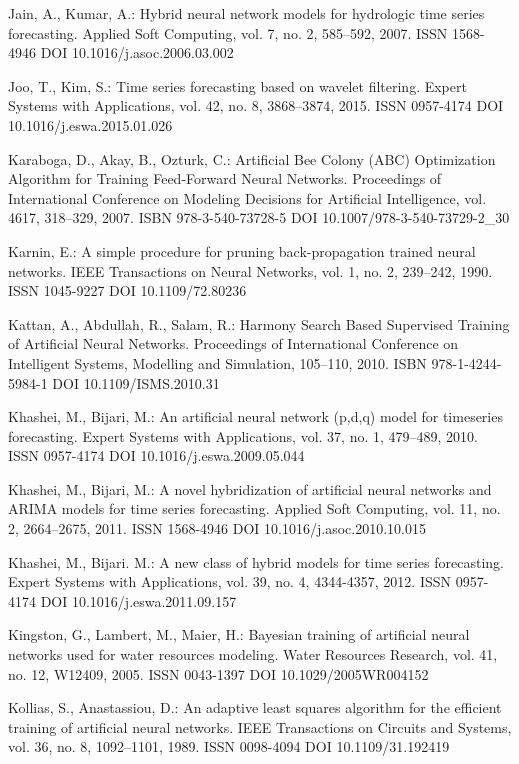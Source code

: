 \begin{thebibliography}{99.}
 Jain, A., Kumar, A.: Hybrid neural network models for hydrologic time series forecasting. Applied Soft Computing, vol. 7, no. 2, 585--592, 2007. ISSN 1568-4946 DOI 10.1016/j.asoc.2006.03.002

 Joo, T., Kim, S.: Time series forecasting based on wavelet filtering. Expert Systems with Applications, vol. 42, no. 8, 3868--3874, 2015. ISSN 0957-4174 DOI 10.1016/j.eswa.2015.01.026

 Karaboga, D., Akay, B., Ozturk, C.: Artificial Bee Colony (ABC) Optimization Algorithm for Training Feed-Forward Neural Networks. Proceedings of International Conference on Modeling Decisions for Artificial Intelligence, vol. 4617, 318--329, 2007. ISBN 978-3-540-73728-5 DOI 10.1007/978-3-540-73729-2\_30

 Karnin, E.: A simple procedure for pruning back-propagation trained neural networks. IEEE Transactions on Neural Networks, vol. 1, no. 2, 239--242, 1990. ISSN 1045-9227 DOI 10.1109/72.80236

 Kattan, A., Abdullah, R., Salam, R.: Harmony Search Based Supervised Training of Artificial Neural Networks. Proceedings of International Conference on Intelligent Systems, Modelling and Simulation, 105--110, 2010. ISBN 978-1-4244-5984-1 DOI 10.1109/ISMS.2010.31

 Khashei, M., Bijari, M.: An artificial neural network (p,d,q) model for timeseries forecasting. Expert Systems with Applications, vol. 37, no. 1, 479--489, 2010. ISSN 0957-4174 DOI 10.1016/j.eswa.2009.05.044

 Khashei, M., Bijari, M.: A novel hybridization of artificial neural networks and ARIMA models for time series forecasting. Applied Soft Computing, vol. 11, no. 2, 2664--2675, 2011. ISSN 1568-4946 DOI 10.1016/j.asoc.2010.10.015

 Khashei, M., Bijari. M.: A new class of hybrid models for time series forecasting. Expert Systems with Applications, vol. 39, no. 4, 4344-4357, 2012. ISSN 0957-4174 DOI 10.1016/j.eswa.2011.09.157

 Kingston, G., Lambert, M., Maier, H.: Bayesian training of artificial neural networks used for water resources modeling. Water Resources Research, vol. 41, no. 12, W12409, 2005. ISSN 0043-1397 DOI 10.1029/2005WR004152

 Kollias, S., Anastassiou, D.: An adaptive least squares algorithm for the efficient training of artificial neural networks. IEEE Transactions on Circuits and Systems, vol. 36, no. 8, 1092--1101, 1989. ISSN 0098-4094 DOI 10.1109/31.192419


\end{thebibliography}
